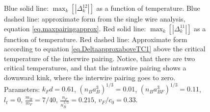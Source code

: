 \begin{figure} 
\begin{center}  
  
\caption{Blue solid line: $\max_k[|\Delta^{12}_k|]$ as a function of temperature. Blue dashed line: approximate form from the single wire analysis, equation \eqref{eq.maxpairingapprox}. Red solid line: $\max_k[|\Delta^{11}_k|]$ as a function of temperature. Red dashed line: Approximate form according to equation \eqref{eq.DeltaapproxaboveTC1} above the critical temperature of the interwire pairing. Notice, that there are two critical temperatures, and that the intrawire pairing shows a downward kink, where the interwire pairing goes to zero. Parameters: $k_Fd = 0.61$, $(n_Ba_B^3)^{1/3} = 0.01$, $(n_Ba_{BF}^3)^{1/3} = 0.11$, $l_t = 0$, $\frac{m_B}{m_F} = 7/40$, $\frac{n_F}{n_B^{1/3}} = 0.215$, $v_F/c_0 = 0.33$.}  
\label{fig.maximalpairingsTdepend_2wires}  
\end{center}    
\end{figure} 



 



